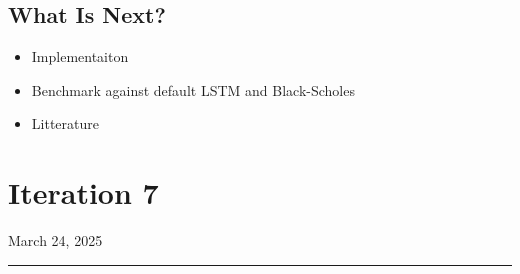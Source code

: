 \documentclass[letterpaper,11pt]{article}
\begin{document}
\subsection*{What Is Next?}
\begin{itemize} 
  \item Implementaiton
  \item Benchmark against default LSTM and Black-Scholes
  \item Litterature
 
\end{itemize}




\newpage
\section*{Iteration 7}
\begin{flushright}
March 24, 2025
\end{flushright}
\hrule
\vspace{0.2in}
\end{document}
